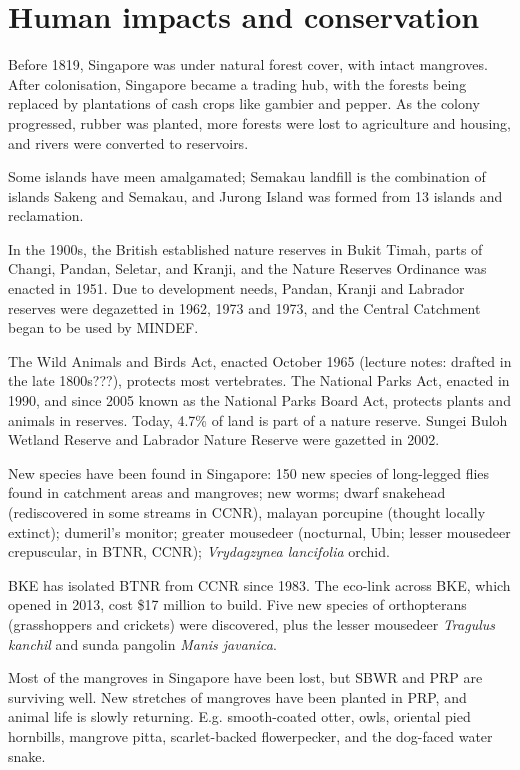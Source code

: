 \documentclass{slnotes}
\newcommand{\scn}[1]{\textit{#1}}
\begin{document}
\chapter{Human impacts and conservation}
Before 1819, Singapore was under natural forest cover, with intact mangroves. After colonisation, Singapore became a trading hub, with the forests being replaced by plantations of cash crops like gambier and pepper. As the colony progressed, rubber was planted, more forests were lost to agriculture and housing, and rivers were converted to reservoirs.

Some islands have meen amalgamated; Semakau landfill is the combination of islands Sakeng and Semakau, and Jurong Island was formed from 13 islands and reclamation.

In the 1900s, the British established nature reserves in Bukit Timah, parts of Changi, Pandan, Seletar, and Kranji, and the Nature Reserves Ordinance was enacted in 1951. Due to development needs, Pandan, Kranji and Labrador reserves were degazetted in 1962, 1973 and 1973, and the Central Catchment began to be used by MINDEF.

The Wild Animals and Birds Act, enacted October 1965 (lecture notes: drafted in the late 1800s???), protects most vertebrates. The National Parks Act, enacted in 1990, and since 2005 known as the National Parks Board Act, protects plants and animals in reserves. Today, 4.7\% of land is part of a nature reserve. Sungei Buloh Wetland Reserve and Labrador Nature Reserve were gazetted in 2002.

New species have been found in Singapore: 150 new species of long-legged flies found in catchment areas and mangroves; new worms; dwarf snakehead (rediscovered in some streams in CCNR), malayan porcupine (thought locally extinct); dumeril’s monitor; greater mousedeer (nocturnal, Ubin; lesser mousedeer crepuscular, in BTNR, CCNR); \scn{Vrydagzynea lancifolia} orchid.

BKE has isolated BTNR from CCNR since 1983. The eco-link across BKE, which opened in 2013, cost \$17 million to build. Five new species of orthopterans (grasshoppers and crickets) were discovered, plus the lesser mousedeer \scn{Tragulus kanchil} and sunda pangolin \scn{Manis javanica}.

Most of the mangroves in Singapore have been lost, but SBWR and PRP are surviving well. New stretches of mangroves have been planted in PRP, and animal life is slowly returning. E.g. smooth-coated otter, owls, oriental pied hornbills, mangrove pitta, scarlet-backed flowerpecker, and the dog-faced water snake.
\end{document}
